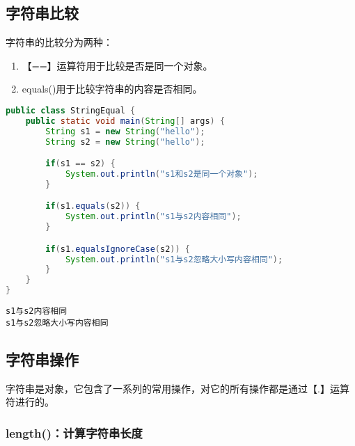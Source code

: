 \vspace{0.5cm}

\subsection{字符串比较}

字符串的比较分为两种：

\begin{enumerate}
	\item 【==】运算符用于比较是否是同一个对象。
	\item equals()用于比较字符串的内容是否相同。
\end{enumerate}


\begin{lstlisting}[language=Java]
public class StringEqual {
	public static void main(String[] args) {
		String s1 = new String("hello");
		String s2 = new String("hello");

		if(s1 == s2) {
			System.out.println("s1和s2是同一个对象");
		}

		if(s1.equals(s2)) {
			System.out.println("s1与s2内容相同");
		}

		if(s1.equalsIgnoreCase(s2)) {
			System.out.println("s1与s2忽略大小写内容相同");
		}
	}
}
\end{lstlisting}

\begin{tcolorbox}
	\begin{verbatim}
s1与s2内容相同
s1与s2忽略大小写内容相同
	\end{verbatim}
\end{tcolorbox}

\vspace{0.5cm}

\subsection{字符串操作}

字符串是对象，它包含了一系列的常用操作，对它的所有操作都是通过【.】运算符进行的。

\subsubsection{length()：计算字符串长度}

\vspace{0.5cm}


